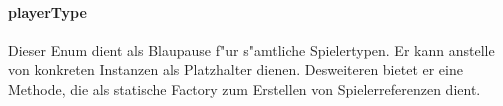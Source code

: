 \paragraph{playerType}
\label{par:playerType}
Dieser Enum dient als Blaupause f"ur s"amtliche Spielertypen. Er kann anstelle von konkreten Instanzen als Platzhalter dienen. Desweiteren bietet er eine Methode, die als statische Factory zum Erstellen von Spielerreferenzen dient. 
